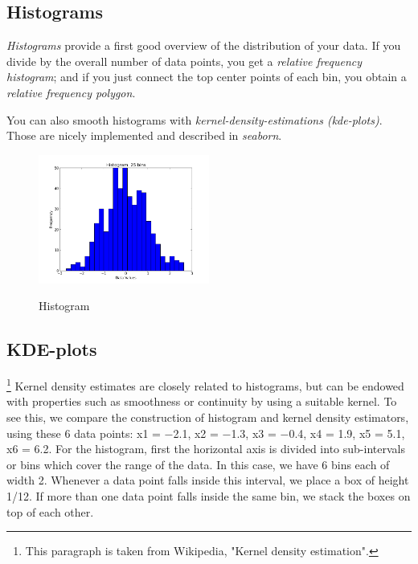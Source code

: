 \subsection{Histograms}


\emph{Histograms} provide a first good overview of the distribution of your data.
If you divide by the overall number of data points, you get a \emph{relative frequency
histogram}; and if you just connect the top center points of each bin, you obtain a
\emph{relative frequency polygon}.

You can also smooth histograms with \emph{kernel-density-estimations (kde-plots)}. Those are nicely implemented and described in \emph{seaborn}.

\begin{figure}[ht]
  \centering
  \includegraphics[width=0.5\textwidth]{../Images/Histogram.png}\\
  \caption{Histogram}
\end{figure}

\subsection{KDE-plots}

\footnote{This paragraph is taken from Wikipedia, "Kernel density estimation".} Kernel density estimates are closely related to histograms, but can be endowed with properties such as smoothness or continuity by using a suitable kernel. To see this, we compare the construction of histogram and kernel density estimators, using these 6 data points: x1 = −2.1, x2 = −1.3, x3 = −0.4, x4 = 1.9, x5 = 5.1, x6 = 6.2. For the histogram, first the horizontal axis is divided into sub-intervals or bins which cover the range of the data. In this case, we have 6 bins each of width 2. Whenever a data point falls inside this interval, we place a box of height 1/12. If more than one data point falls inside the same bin, we stack the boxes on top of each other.

